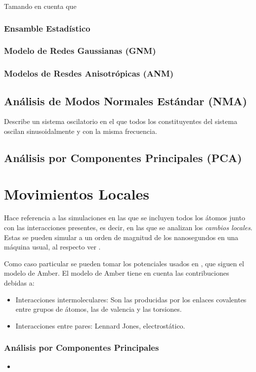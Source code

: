 Tamando en cuenta que 
\subsubsection{Ensamble Estad\'{i}stico}
\subsubsection{Modelo de Redes Gaussianas (GNM)}
\subsubsection{Modelos de Resdes Anisotr\'{o}picas (ANM)}
\subsection{An\'{a}lisis de Modos Normales Est\'{a}ndar (NMA)}
Describe un sistema oscilatorio en el que todos los constituyentes del sistema oscilan sinusoidalmente y con la misma frecuencia.
\subsection{An\'{a}lisis por Componentes Principales (PCA)}
\section{Movimientos Locales}
Hace referencia a las simulaciones en las que se incluyen todos los \'{a}tomos junto con las interacciones presentes, es decir, en las que se analizan los \textit{cambios locales}. Estas se pueden simular a un orden de magnitud de los nanosegundos en una m\'{a}quina usual, al respecto ver \cite{Gur2013GlobalPredictions.}.

Como caso particular se pueden tomar los potenciales usados en \cite{Amber2016AmberManual}, que siguen el modelo de Amber. El modelo de Amber tiene en cuenta las contribuciones debidas a:
 \begin{itemize}
\item Interacciones intermoleculares: Son las producidas por los enlaces covalentes entre grupos de \'{a}tomos, las de valencia y las torsiones.
\item Interacciones entre pares: Lennard Jones, electrost\'{a}tico.
\end{itemize}

\subsubsection{An\'{a}lisis por Componentes Principales}

\begin{itemize}
\item 
\end{itemize}
